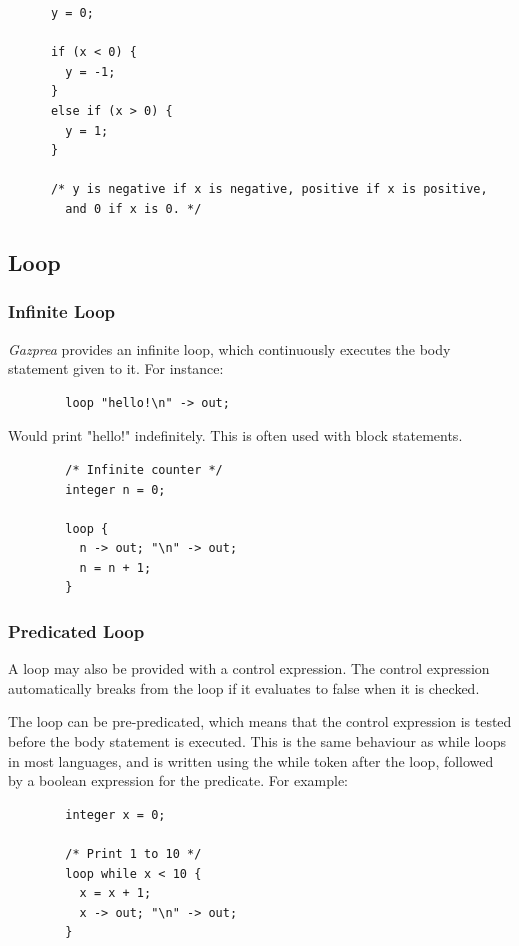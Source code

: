 \documentclass{article}
\begin{document}
    \begin{lstlisting}
      y = 0;

      if (x < 0) {
        y = -1;
      }
      else if (x > 0) {
        y = 1;
      }

      /* y is negative if x is negative, positive if x is positive,
        and 0 if x is 0. */
    \end{lstlisting}


  \subsection{Loop}\label{sec:loop}
    \subsubsection{Infinite Loop}\label{sec:infLoop}
      \textit{Gazprea} provides an infinite loop, which continuously executes the body statement given to it. For
      instance:

      \begin{lstlisting}
        loop "hello!\n" -> out;
      \end{lstlisting}

      Would print "hello!" indefinitely. This is often used with block statements.

      \begin{lstlisting}
        /* Infinite counter */
        integer n = 0;

        loop {
          n -> out; "\n" -> out;
          n = n + 1;
        }
      \end{lstlisting}

    \subsubsection{Predicated Loop}\label{sec:predicatedLoop}

      A loop may also be provided with a control expression. The control expression automatically breaks from the
      loop if it evaluates to false when it is checked.

      The loop can be pre-predicated, which means that the control expression is tested before the body statement
      is executed. This is the same behaviour as while loops in most languages, and is written using the while
      token after the loop, followed by a boolean expression for the predicate. For example:

      \begin{lstlisting}
        integer x = 0;

        /* Print 1 to 10 */
        loop while x < 10 {
          x = x + 1;
          x -> out; "\n" -> out;
        }
      \end{lstlisting}
\end{document}
